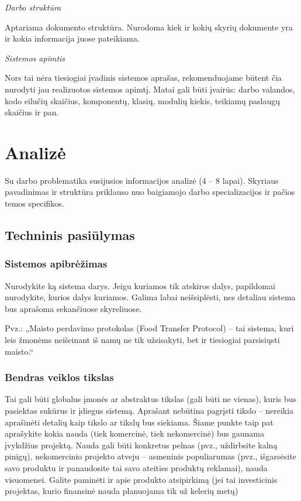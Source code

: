 \documentclass{ktuthesis}
\begin{document}
  \textit{Darbo struktūra}

  Aptariama dokumento struktūra. Nurodoma kiek ir kokių skyrių dokumente yra ir kokia informacija juose pateikiama.

  \textit{Sistemos apimtis}

  Nors tai nėra tiesiogiai įvadinis sistemos aprašas, rekomenduojame būtent čia nurodyti jau realizuotos sistemos apimtį. Matai gali būti įvairūs: darbo valandos, kodo eilučių skaičius, komponentų, klasių, modulių kiekis, teikiamų paslaugų skaičius ir pan.

  \clearpage

  \section{Analizė}

  Su darbo problematika susijusios informacijos analizė (4 – 8 lapai). Skyriaus pavadinimas ir struktūra priklauso nuo baigiamojo darbo specializacijos ir pačios temos specifikos.

  \subsection{Techninis pasiūlymas}

  \subsubsection{Sistemos apibrėžimas}

  Nurodykite ką sistema darys. Jeigu kuriamos tik atskiros dalys, papildomai nurodykite, kurios dalys kuriamos. Galima labai neišsiplėsti, nes detaliau sistema bus aprašoma sekančiuose skyreliuose.

  Pvz.: „Maisto perdavimo protokolas (Food Transfer Protocol) – tai sistema, kuri leis žmonėms neišeinant iš namų ne tik užsisakyti, bet ir tiesiogiai parsisiųsti maisto.“

  \subsubsection{Bendras veiklos tikslas}

  Tai gali būti globalus įmonės ar abstraktus tikslas (gali būti ne vienas), kuris bus pasiektas sukūrus ir įdiegus sistemą. Aprašant nebūtina pagrįsti tikslo – nereikia aprašinėti detalių kaip tikslo ar tikslų bus siekiama. Šiame punkte taip pat aprašykite kokia nauda (tiek komercinė, tiek nekomercinė) bus gaunama įvykdžius projektą. Nauda gali būti konkretus pelnas (pvz., uždirbsite kalną pinigų), nekomercinio projekto atveju – asmeninis populiarumas (pvz., išgarsėsite savo produktu ir panaudosite tai savo ateities produktų reklamai), nauda visuomenei. Galite paminėti ir apie produkto atsipirkimą (jei tai investicinis projektas, kurio finansinė nauda planuojama tik už kelerių metų)
\end{document}
